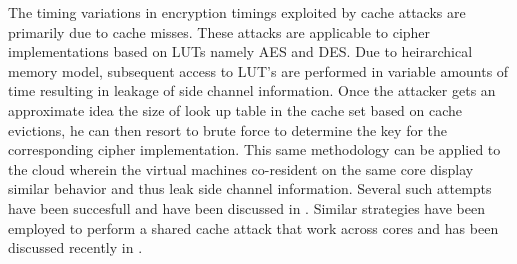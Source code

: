 \documentclass[twocolumn]{IEEEtran}
\begin{document}
The timing variations in encryption timings exploited by cache attacks are primarily due to cache misses. These attacks are applicable to cipher implementations based on LUTs namely AES and DES. Due to heirarchical memory model, subsequent access to LUT's are performed in variable amounts of time resulting in leakage of side channel information. Once the attacker gets an approximate idea the size of look up table in the cache set based on cache evictions, he can then resort to brute force to determine the key for the corresponding cipher implementation. This same methodology can be applied to the cloud wherein the virtual machines co-resident on the same core display similar behavior and thus leak side channel information. Several such attempts have been succesfull and have been discussed in  \cite{sc2015lastlevel}.  Similar strategies have been employed to perform a shared cache attack that work across cores and has been discussed recently in \cite{ir2015aes}.






\end{document}
